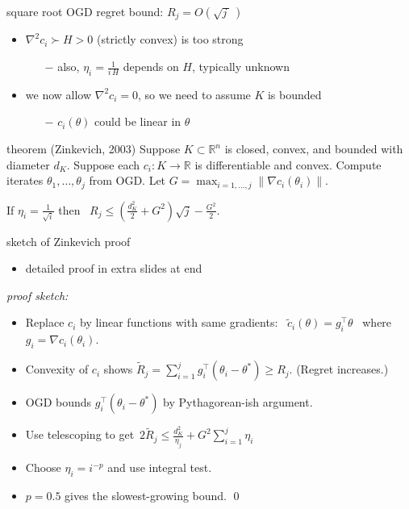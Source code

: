 \documentclass[xcolor={svgnames},
               hyperref={colorlinks,citecolor=DeepPink4,linkcolor=FireBrick,urlcolor=Maroon},
               usepdftitle=false]  %
               {beamer}
\newcommand{\grad}{\nabla}
\newcommand{\RR}{\mathbb{R}}
\newcommand{\ds}{\displaystyle}
\begin{document}
\begin{frame}{square root OGD regret bound: $R_j = O(\sqrt{j\,}\,)$}

\begin{itemize}
\item $\grad^2 c_i \succ H > 0$ (strictly convex) is too strong
    \begin{itemize}
    \item[$-$] also, $\eta_i = \frac{1}{i\,H}$ depends on $H$, typically unknown
    \end{itemize}
\item we now allow $\grad^2 c_i = 0$, so we need to assume $K$ is bounded
    \begin{itemize}
    \item[$-$] $c_i(\theta)$ could be linear in $\theta$
    \end{itemize}
\end{itemize}

\begin{block}{theorem (Zinkevich, 2003)}
Suppose $K\subset \RR^n$ is closed, convex, and bounded with diameter $d_K$.  Suppose each $c_i:K \to \RR$ is differentiable and convex.  Compute iterates $\theta_1,\dots,\theta_j$ from OGD.  Let $G = \max_{i=1,\dots,j} \|\grad c_i(\theta_i)\|$.

If $\ds \eta_i = \frac{1}{\sqrt{i}}$ then \, $\ds \boxed{R_j \le \left(\frac{d_K^2}{2} + G^2\right) \sqrt{j} - \frac{G^2}{2}.}$
\end{block}
\end{frame}


\begin{frame}{sketch of Zinkevich proof}
\begin{itemize}
\item detailed proof in extra slides at end
\end{itemize}

\bigskip
\noindent \emph{proof sketch:}

\begin{itemize}
\item Replace $c_i$ by linear functions with same gradients: \, $\tilde c_i(\theta) = g_i^\top \theta$ \, where $g_i = \grad c_i(\theta_i)$.
\item Convexity of $c_i$ shows {\small $\ds \tilde R_j = \sum_{i=1}^j g_i^\top (\theta_i - \theta^*) \ge R_j$}.  (Regret increases.)
\item OGD bounds $g_i^\top (\theta_i - \theta^*)$ by Pythagorean-ish argument.
\item Use telescoping to get\, $\ds 2 \tilde R_j \le \frac{d_K^2}{\eta_j} + G^2 \sum_{i=1}^j \eta_i$
\item Choose $\eta_i = i^{-p}$ and use integral test.
\item $p=0.5$ gives the slowest-growing bound. \hfill \qed
\end{itemize}
\end{frame}
\end{document}
